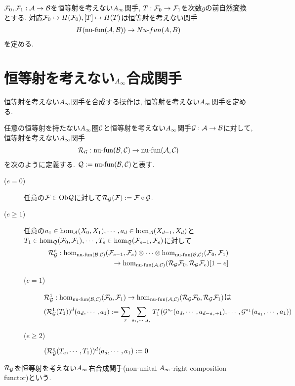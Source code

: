 \documentclass[uplatex, a4paper, 14Q, dvipdfmx]{jsarticle}
\begin{document}
\begin{corollary}
  $\F_0,\F_1 : \A \to \B$を恒等射を考えない$\Ainf$関手, $T : \F_0 \to \F_1$を次数$g$の前自然変換とする. 
  対応$\F_0 \mapsto H(\F_0), [T] \mapsto H(T)$は恒等射を考えない関手
  \begin{align*}
    H(\nufun{\A}{\B}) \to Nu\text{-}fun(A,B)
  \end{align*}
  を定める. 
\end{corollary}

\section{恒等射を考えない\texorpdfstring{$\Ainf$}{Ainf}合成関手} \label{section_Ainf_composition_functor}

恒等射を考えない$\Ainf$関手を合成する操作は, 恒等射を考えない$\Ainf$関手を定める. 

\begin{definition}
  任意の恒等射を持たない$\Ainf$圏$\C$と恒等射を考えない$\Ainf$関手$\G : \A \to \B$に対して, 恒等射を考えない$\Ainf$関手
  \begin{align*}
    \RG : \nufun{\B}{\C} \to \nufun{\A}{\C} 
  \end{align*}
  を次のように定義する. 
  $\Q := \nufun{\B}{\C}$と表す. 
  \begin{description}
    \item[($e=0$)] 任意の$\F \in \Ob\Q$に対して$\RG(\F) := \F \circ \G $.
    \item[($e \geq 1$)] 任意の$a_1 \in \hom_\A(X_0,X_1), \cdots, a_d \in \hom_\A(X_{d-1},X_d)$と$T_1 \in \hom_\Q(\F_0,\F_1), \cdots, T_e \in \hom_\Q(\F_{e-1},\F_e)$に対して
    \begin{align*}
      \RG^e : \hom_{\nufun{\B}{\C}}(\F_{e-1},\F_e) \otimes \cdots \otimes \hom_{\nufun{\B}{\C}}(\F_0,\F_1) \\
      \to \hom_{\nufun{\A}{\C}}(\RG \F_0,\RG \F_e)[1-e]
    \end{align*}
    \begin{description}
      \item[($e=1$)] $\RG^1: \hom_{\nufun{\B}{\C}} (\F_0,\F_1) \to \hom_{\nufun{\A}{\C}} (\RG \F_0,\RG \F_1)$は
      \begin{align*}
        (\RG^1(T_1))^d(a_d,\cdots,a_1)
        := \sum_r \sum_{s_1,\cdots,s_r} T_1^r(\G^{s_r}(a_d,\cdots,a_{d-s_r+1}), \cdots, \G^{s_1}(a_{s_1},\cdots,a_1))
      \end{align*}
      \item[($e \geq 2$)] $(\RG^e(T_e,\cdots,T_1))^d(a_d,\cdots,a_1) := 0$
    \end{description}
  \end{description}
  $\RG$を恒等射を考えない$\Ainf$右合成関手(non-unital $\Ainf$-right composition functor)という. 
\end{definition}
\end{document}
